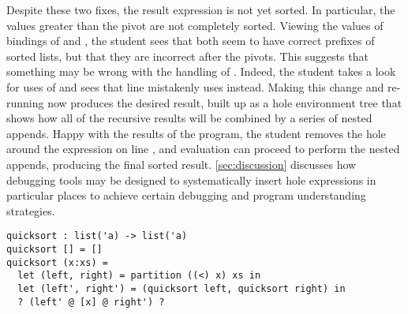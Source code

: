 Despite these two fixes, the result expression is not yet sorted.
%
In particular, the values greater than the pivot  are not completely
sorted.
%
Viewing the values of bindings of  and , the student sees
that both seem to have correct prefixes of sorted lists, but that they are
incorrect after the pivots.
%
This suggests that something may be wrong with the handling of .
%
Indeed, the student takes a look for uses of  and sees that line
 mistakenly uses  instead.
%
Making this change and re-running now produces the desired result, built up as a
hole environment tree that shows how all of the recursive results will be
combined by a series of nested appends.
%
Happy with the results of the program, the student removes the hole around the
expression on line , and evaluation can proceed to perform the nested
appends, producing the final sorted result.
%
\autoref{sec:discussion} discusses how debugging tools may be designed to
systematically insert hole expressions in particular places to achieve certain
debugging and program understanding strategies.
%
%

\begin{lstlisting}
quicksort : list('a) -> list('a)
quicksort [] = []
quicksort (x:xs) =
  let (left, right) = partition ((<) x) xs in
  let (left', right') = (quicksort left, quicksort right) in
  ? (left' @ [x] @ right') ?
\end{lstlisting}
